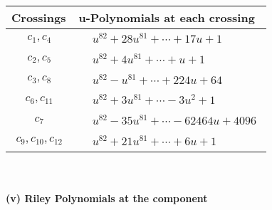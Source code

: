 \documentclass[1p]{elsarticle_modified}
\theoremstyle{definition}
\begin{document}
\begin{tabular}{m{50pt}|m{274pt}}
Crossings & \hspace{64pt}u-Polynomials at each crossing \\
\hline $$\begin{aligned}c_{1},c_{4}\end{aligned}$$&$\begin{aligned}
&u^{82}+28 u^{81}+\cdots+17 u+1
\end{aligned}$\\
\hline $$\begin{aligned}c_{2},c_{5}\end{aligned}$$&$\begin{aligned}
&u^{82}+4 u^{81}+\cdots+u+1
\end{aligned}$\\
\hline $$\begin{aligned}c_{3},c_{8}\end{aligned}$$&$\begin{aligned}
&u^{82}- u^{81}+\cdots+224 u+64
\end{aligned}$\\
\hline $$\begin{aligned}c_{6},c_{11}\end{aligned}$$&$\begin{aligned}
&u^{82}+3 u^{81}+\cdots-3 u^2+1
\end{aligned}$\\
\hline $$\begin{aligned}c_{7}\end{aligned}$$&$\begin{aligned}
&u^{82}-35 u^{81}+\cdots-62464 u+4096
\end{aligned}$\\
\hline $$\begin{aligned}c_{9},c_{10},c_{12}\end{aligned}$$&$\begin{aligned}
&u^{82}+21 u^{81}+\cdots+6 u+1
\end{aligned}$\\
\hline
\end{tabular}\\~\\
\newpage\renewcommand{\arraystretch}{1}
\flushleft \textbf{(v) Riley Polynomials at the component}\newline \\
\end{document}
